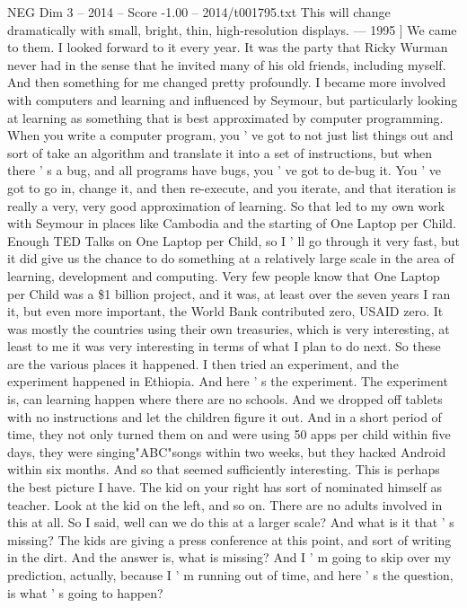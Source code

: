 \begin{textsample}{NEG Dim 3 – 2014 – Score -1.00 – 2014/t001795.txt}
This will change dramatically with small, bright, thin, high-resolution displays. — 1995 ] We came to them.
I looked forward to it every year.
It was the party that Ricky Wurman never had in the sense that he invited many of his old friends, including myself.
And then something for me changed pretty profoundly.
I became more involved with computers and learning and influenced by Seymour, but particularly looking at learning as something that is best approximated by computer programming.
When you write a computer program, you ' ve got to not just list things out and sort of take an algorithm and translate it into a set of instructions, but when there ' s a bug, and all programs have bugs, you ' ve got to de-bug it.
You ' ve got to go in, change it, and then re-execute, and you iterate, and that iteration is really a very, very good approximation of learning.
So that led to my own work with Seymour in places like Cambodia and the starting of One Laptop per Child.
Enough TED Talks on One Laptop per Child, so I ' ll go through it very fast, but it did give us the chance to do something at a relatively large scale in the area of learning, development and computing.
Very few people know that One Laptop per Child was a \$1 billion project, and it was, at least over the seven years I ran it, but even more important, the World Bank contributed zero, USAID zero.
It was mostly the countries using their own treasuries, which is very interesting, at least to me it was very interesting in terms of what I plan to do next.
So these are the various places it happened.
I then tried an experiment, and the experiment happened in Ethiopia.
And here ' s the experiment.
The experiment is, can learning happen where there are no schools.
And we dropped off tablets with no instructions and let the children figure it out.
And in a short period of time, they not only turned them on and were using 50 apps per child within five days, they were singing"ABC"songs within two weeks, but they hacked Android within six months.
And so that seemed sufficiently interesting.
This is perhaps the best picture I have.
The kid on your right has sort of nominated himself as teacher.
Look at the kid on the left, and so on.
There are no adults involved in this at all.
So I said, well can we do this at a larger scale?
And what is it that ' s missing?
The kids are giving a press conference at this point, and sort of writing in the dirt.
And the answer is, what is missing?
And I ' m going to skip over my prediction, actually, because I ' m running out of time, and here ' s the question, is what ' s going to happen?

\end{textsample}
